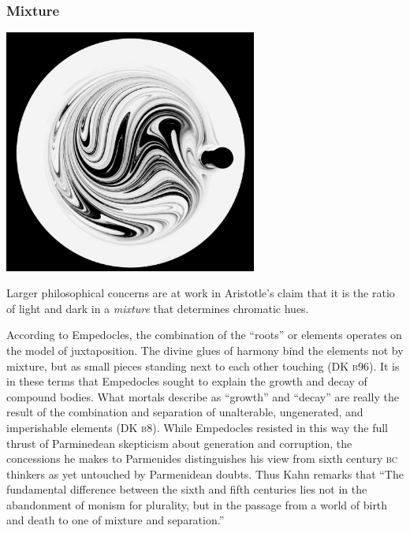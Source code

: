 \begin{frame}[t]\frametitle{Mixture}
	\begin{center}
		\includegraphics[height=8cm]{../../graphics/mixing.jpg}
	\end{center}
\end{frame}

Larger philosophical concerns are at work in Aristotle's claim that it is the ratio of light and dark in a \emph{mixture} that determines chromatic hues. %

According to Empedocles, the combination of the ``roots'' or elements operates on the model of juxtaposition. The divine glues of harmony bind the elements not by mixture, but as small pieces standing next to each other touching (DK \textsc{b}96). It is in these terms that Empedocles sought to explain the growth and decay of compound bodies. What mortals describe as ``growth'' and ``decay'' are really the result of the combination and separation of unalterable, ungenerated, and imperishable elements (DK \textsc{b}8). While Empedocles resisted in this way the full thrust of Parminedean skepticism about generation and corruption, the concessions he makes to Parmenides distinguishes his view from sixth century \textsc{bc} thinkers as yet untouched by Parmenidean doubts. Thus Kahn remarks that ``The fundamental difference between the sixth and fifth centuries lies not in the abandonment of monism for plurality, but in the passage from a world of birth and death to one of mixture and separation.'' 

